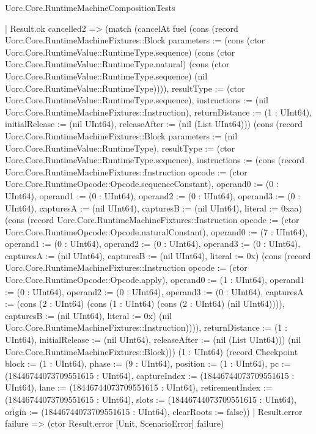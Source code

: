\begin{lexlean}{Uorc.Core.RuntimeMachineCompositionTests}
\begin{semanticmodule}
{        | Result.ok cancelled2 => (match (cancelAt fuel (cons (record Uorc.Core.RuntimeMachineFixtures::Block {parameters := (cons (ctor Uorc.Core.RuntimeValue::RuntimeType.sequence) (cons (ctor Uorc.Core.RuntimeValue::RuntimeType.natural) (cons (ctor Uorc.Core.RuntimeValue::RuntimeType.sequence) (nil Uorc.Core.RuntimeValue::RuntimeType)))), resultType := (ctor Uorc.Core.RuntimeValue::RuntimeType.sequence), instructions := (nil Uorc.Core.RuntimeMachineFixtures::Instruction), returnDistance := (1 : UInt64), initialRelease := (nil UInt64), releaseAfter := (nil (List UInt64))}) (cons (record Uorc.Core.RuntimeMachineFixtures::Block {parameters := (nil Uorc.Core.RuntimeValue::RuntimeType), resultType := (ctor Uorc.Core.RuntimeValue::RuntimeType.sequence), instructions := (cons (record Uorc.Core.RuntimeMachineFixtures::Instruction {opcode := (ctor Uorc.Core.RuntimeOpcode::Opcode.sequenceConstant), operand0 := (0 : UInt64), operand1 := (0 : UInt64), operand2 := (0 : UInt64), operand3 := (0 : UInt64), capturesA := (nil UInt64), capturesB := (nil UInt64), literal := 0xaa}) (cons (record Uorc.Core.RuntimeMachineFixtures::Instruction {opcode := (ctor Uorc.Core.RuntimeOpcode::Opcode.naturalConstant), operand0 := (7 : UInt64), operand1 := (0 : UInt64), operand2 := (0 : UInt64), operand3 := (0 : UInt64), capturesA := (nil UInt64), capturesB := (nil UInt64), literal := 0x}) (cons (record Uorc.Core.RuntimeMachineFixtures::Instruction {opcode := (ctor Uorc.Core.RuntimeOpcode::Opcode.apply), operand0 := (1 : UInt64), operand1 := (0 : UInt64), operand2 := (0 : UInt64), operand3 := (0 : UInt64), capturesA := (cons (2 : UInt64) (cons (1 : UInt64) (cons (2 : UInt64) (nil UInt64)))), capturesB := (nil UInt64), literal := 0x}) (nil Uorc.Core.RuntimeMachineFixtures::Instruction)))), returnDistance := (1 : UInt64), initialRelease := (nil UInt64), releaseAfter := (nil (List UInt64))}) (nil Uorc.Core.RuntimeMachineFixtures::Block))) (1 : UInt64) (record Checkpoint {block := (1 : UInt64), phase := (9 : UInt64), position := (1 : UInt64), pc := (18446744073709551615 : UInt64), captureIndex := (18446744073709551615 : UInt64), lane := (18446744073709551615 : UInt64), retirementIndex := (18446744073709551615 : UInt64), slots := (18446744073709551615 : UInt64), origin := (18446744073709551615 : UInt64), clearRoots := false}))
          | Result.error failure => (ctor Result.error [Unit, ScenarioError] failure)
}
\end{semanticmodule}
\end{lexlean}
